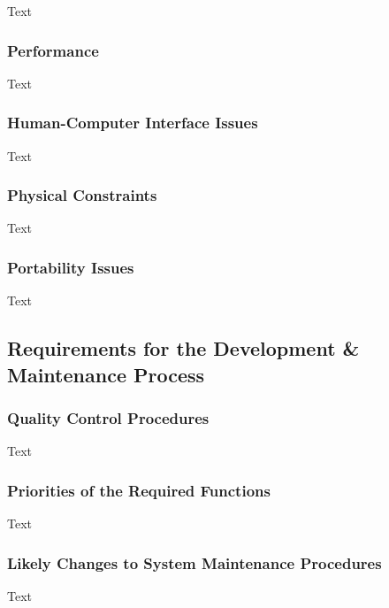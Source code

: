 \documentclass[12pt]{article}
\begin{document}
Text

\subsubsection {Performance}

Text

\subsubsection {Human-Computer Interface Issues}

Text

\subsubsection {Physical Constraints}

Text

\subsubsection {Portability Issues}

Text

\subsection{Requirements for the Development & Maintenance Process}

\subsubsection {Quality Control Procedures}

Text

\subsubsection {Priorities of the Required Functions}

Text

\subsubsection {Likely Changes to System Maintenance Procedures}

Text
\end{document}
